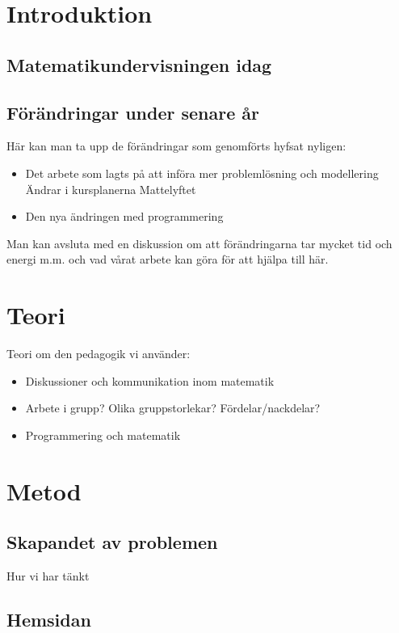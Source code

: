 \section{Introduktion}

    \subsection{Matematikundervisningen idag}
    
    \subsection{Förändringar under senare år}
        Här kan man ta upp de förändringar som genomförts hyfsat nyligen: 
        \begin{itemize}
            \item Det arbete som lagts på att införa mer problemlösning och modellering
                \subitem Ändrar i kursplanerna
                \subitem Mattelyftet
            \item Den nya ändringen med programmering
        \end{itemize}
        Man kan avsluta med en diskussion om att förändringarna tar mycket tid och energi m.m. och vad vårat arbete kan göra för att hjälpa till här.
        
\section{Teori}
    Teori om den pedagogik vi använder:
    \begin{itemize}
        \item Diskussioner och kommunikation inom matematik  %
        \item Arbete i grupp? Olika gruppstorlekar? Fördelar/nackdelar? %
        \item Programmering och matematik
    \end{itemize}

\section{Metod}
    \subsection{Skapandet av problemen}
        Hur vi har tänkt

    \subsection{Hemsidan}
    
